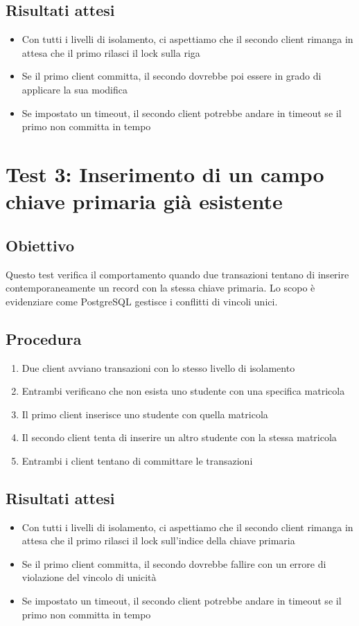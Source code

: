 \documentclass[a4paper,12pt]{report}
\begin{document}
\subsection{Risultati attesi}
\begin{itemize}
    \item Con tutti i livelli di isolamento, ci aspettiamo che il secondo client rimanga in attesa che il primo rilasci il lock sulla riga
    \item Se il primo client committa, il secondo dovrebbe poi essere in grado di applicare la sua modifica
    \item Se impostato un timeout, il secondo client potrebbe andare in timeout se il primo non committa in tempo
\end{itemize}

\section{Test 3: Inserimento di un campo chiave primaria già esistente}
\subsection{Obiettivo}
Questo test verifica il comportamento quando due transazioni tentano di inserire contemporaneamente un record con la stessa chiave primaria. Lo scopo è evidenziare come PostgreSQL gestisce i conflitti di vincoli unici.

\subsection{Procedura}
\begin{enumerate}
    \item Due client avviano transazioni con lo stesso livello di isolamento
    \item Entrambi verificano che non esista uno studente con una specifica matricola
    \item Il primo client inserisce uno studente con quella matricola
    \item Il secondo client tenta di inserire un altro studente con la stessa matricola
    \item Entrambi i client tentano di committare le transazioni
\end{enumerate}

\subsection{Risultati attesi}
\begin{itemize}
    \item Con tutti i livelli di isolamento, ci aspettiamo che il secondo client rimanga in attesa che il primo rilasci il lock sull'indice della chiave primaria
    \item Se il primo client committa, il secondo dovrebbe fallire con un errore di violazione del vincolo di unicità
    \item Se impostato un timeout, il secondo client potrebbe andare in timeout se il primo non committa in tempo
\end{itemize}
\end{document}
